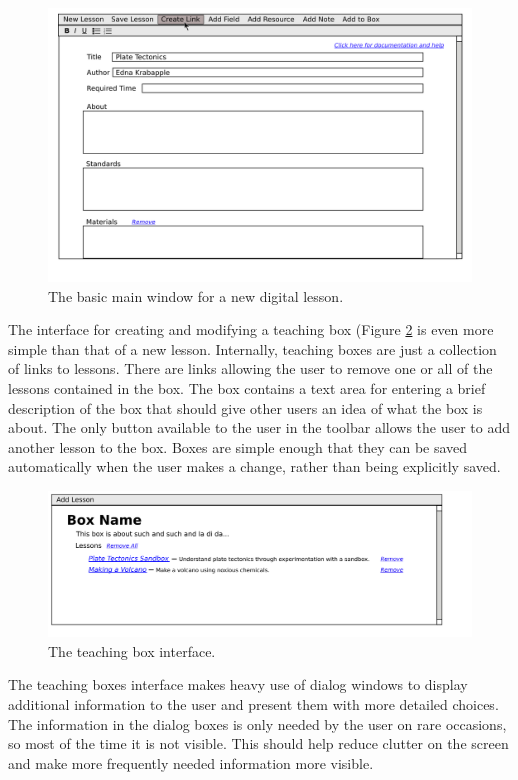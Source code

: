 \documentclass[10pt,letter,titlepage]{article}
\begin{document}
\begin{figure}
	\centering
	\includegraphics[width=0.9\linewidth]{../../low-fi_prototype/button_mouseover}
	\caption{The basic main window for a new digital lesson.}
	\label{fig: main window}
\end{figure}

The interface for creating and modifying a teaching box (Figure \ref{fig: new box}
is even more simple than that of a new lesson. Internally, teaching boxes are
just a collection of links to lessons. There are links allowing the user to
remove one or all of the lessons contained in the box. The box contains a text
area for entering a brief description of the box that should give other users an
idea of what the box is about. The only button available to the user in the
toolbar allows the user to add another lesson to the box. Boxes are simple
enough that they can be saved automatically when the user makes a change, rather
than being explicitly saved.

\begin{figure}
	\centering
	\includegraphics[width=0.9\linewidth]{../../low-fi_prototype/teaching_box}
	\caption{The teaching box interface.}
	\label{fig: new box}
\end{figure}

The teaching boxes interface makes heavy use of dialog windows to display
additional information to the user and present them with more detailed choices.
The information in the dialog boxes is only needed by the user on rare
occasions, so most of the time it is not visible. This should help reduce
clutter on the screen and make more frequently needed information more visible.
\end{document}
